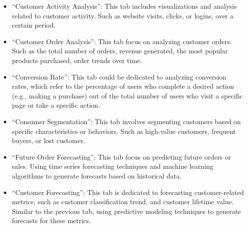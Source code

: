 \documentclass[
  11pt,
]{article}
\begin{document}
\begin{itemize}
\item
  ``Customer Activity Analysis'': This tab includes visualizations and
  analysis related to customer activity. Such as website visits, clicks,
  or logins, over a certain period.
\item
  ``Customer Order Analysis'': This tab focus on analyzing customer
  orders. Such as the total number of orders, revenue generated, the
  most popular products purchased, order trends over time.
\item
  ``Conversion Rate'': This tab could be dedicated to analyzing
  conversion rates, which refer to the percentage of users who complete
  a desired action (e.g., making a purchase) out of the total number of
  users who visit a specific page or take a specific action.
\item
  ``Consumer Segmentation'': This tab involves segmenting customers
  based on specific characteristics or behaviors. Such as high-value
  customers, frequent buyers, or lost customer.
\item
  ``Future Order Forecasting'': This tab focus on predicting future
  orders or sales. Using time series forecasting techniques and machine
  learning algorithms to generate forecasts based on historical data.
\item
  ``Customer Forecasting'': This tab is dedicated to forecasting
  customer-related metrics, such as customer classification trend, and
  customer lifetime value. Similar to the previous tab, using predictive
  modeling techniques to generate forecasts for these metrics.
\end{itemize}
\end{document}
